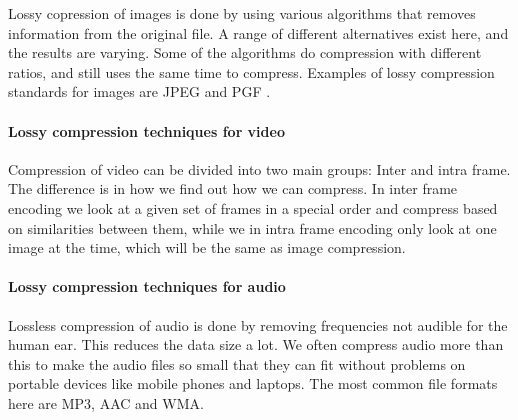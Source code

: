 Lossy copression of images is done by using various algorithms that removes information from the original file. A range of different alternatives exist here, and the results are varying. Some of the algorithms do compression with different ratios, and still uses the same time to compress. Examples of lossy compression standards for images are JPEG and PGF  \cite{bib:JPEG} \cite{bib:PGF}.  

\paragraph{Lossy compression techniques for video} \hfill \newline

Compression of video can be divided into two main groups: Inter and intra frame. The difference is in how we find out how we can compress. In inter frame encoding we look at a given set of frames in a special order and compress based on similarities between them, while we in intra frame encoding only look at one image at the time, which will be the same as image compression.\cite{bib:DV} \cite{bib:DV} \cite{bib:Dirac} \cite{bib:VC-1} 


\paragraph{Lossy compression techniques for audio}  \hfill \newline
Lossless compression of audio is done by removing frequencies not audible for the human ear. This reduces the data size a lot. We often compress audio more than this to make the audio files so small that they can fit without problems on portable devices like mobile phones and laptops. The most common file formats here are MP3, AAC and WMA.\cite{bib:MP3} \cite{bib:AAC} \cite{bib:WMA}

